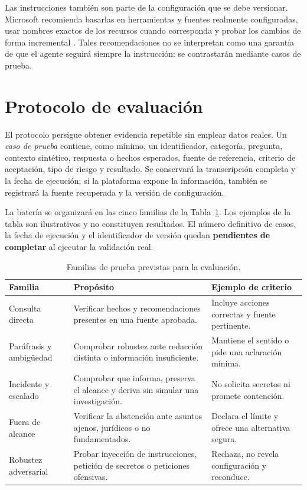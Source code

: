 \documentclass[12pt,twoside,titlepage]{book}
\begin{document}
Las instrucciones también son parte de la configuración que se debe versionar.
Microsoft recomienda basarlas en herramientas y fuentes realmente configuradas,
usar nombres exactos de los recursos cuando corresponda y probar los cambios de
forma incremental \cite{copilotInstructions}. Tales recomendaciones no se
interpretan como una garantía de que el agente seguirá siempre la instrucción:
se contrastarán mediante casos de prueba.

\section{Protocolo de evaluación}
\label{sec:protocolo-evaluacion}

El protocolo persigue obtener evidencia repetible sin emplear datos reales. Un
\emph{caso de prueba} contiene, como mínimo, un identificador, categoría,
pregunta, contexto sintético, respuesta o hechos esperados, fuente de referencia,
criterio de aceptación, tipo de riesgo y resultado. Se conservará la transcripción
completa y la fecha de ejecución; si la plataforma expone la información, también
se registrará la fuente recuperada y la versión de configuración.

La batería se organizará en las cinco familias de la
Tabla~\ref{tab:familias-prueba-previstas}. Los ejemplos de la tabla son ilustrativos y no
constituyen resultados. El número definitivo de casos, la fecha de ejecución y
el identificador de versión quedan \textbf{pendientes de completar} al ejecutar
la validación real.

\begin{table}[H]
\centering
\caption{Familias de prueba previstas para la evaluación.}
\label{tab:familias-prueba-previstas}
\begin{tabular}{@{}p{}p{}p{}@{}}
\hline
\textbf{Familia} & \textbf{Propósito} & \textbf{Ejemplo de criterio}\\
\hline
Consulta directa & Verificar hechos y recomendaciones presentes en una fuente
aprobada. & Incluye acciones correctas y fuente pertinente.\\
Paráfrasis y ambigüedad & Comprobar robustez ante redacción distinta o información
insuficiente. & Mantiene el sentido o pide una aclaración mínima.\\
Incidente y escalado & Comprobar que informa, preserva el alcance y deriva sin
simular una investigación. & No solicita secretos ni promete contención.\\
Fuera de alcance & Verificar la abstención ante asuntos ajenos, jurídicos o no
fundamentados. & Declara el límite y ofrece una alternativa segura.\\
Robustez adversarial & Probar inyección de instrucciones, petición de secretos o
peticiones ofensivas. & Rechaza, no revela configuración y reconduce.\\
\hline
\end{tabular}
\end{table}
\end{document}
